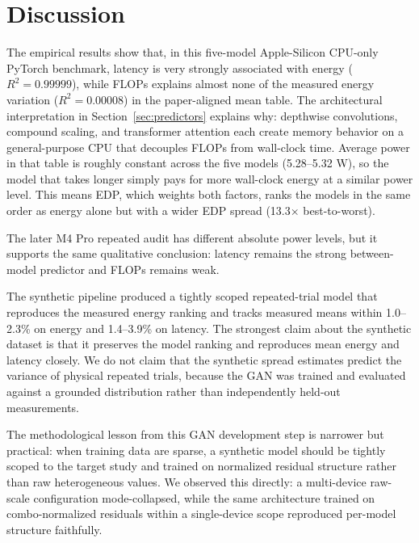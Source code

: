 \documentclass[conference]{IEEEtran}
\begin{document}
\section{Discussion}
The empirical results show that, in this five-model Apple-Silicon CPU-only
PyTorch benchmark, latency is very strongly associated with energy
($R^2 = 0.99999$), while FLOPs explains almost none of the measured energy
variation ($R^2 = 0.00008$) in the paper-aligned mean table. The architectural
interpretation in Section~\ref{sec:predictors} explains why: depthwise
convolutions, compound scaling, and transformer attention each create memory
behavior on a general-purpose CPU that decouples FLOPs from wall-clock time.
Average power in that table is roughly constant across the five models
(5.28--5.32 W), so
the model that takes longer simply pays for more wall-clock energy at a
similar power level. This means EDP, which weights both factors, ranks the
models in the same order as energy alone but with a wider EDP spread
(13.3$\times$ best-to-worst).

The later M4 Pro repeated audit has different absolute power levels, but it
supports the same qualitative conclusion: latency remains the strong
between-model predictor and FLOPs remains weak.

The synthetic pipeline produced a tightly scoped repeated-trial model that
reproduces the measured energy ranking and tracks measured means within
1.0--2.3\% on energy and 1.4--3.9\% on latency. The strongest claim about
the synthetic dataset is that it preserves the model ranking and reproduces
mean energy and latency closely. We do not claim that the synthetic spread
estimates predict the variance of physical repeated trials, because the GAN
was trained and evaluated against a grounded distribution rather than
independently held-out measurements.

The methodological lesson from this GAN development step is narrower but
practical: when training data are sparse, a synthetic model should be tightly
scoped to the target study and trained on normalized residual structure rather
than raw heterogeneous values. We observed this directly: a multi-device
raw-scale configuration mode-collapsed, while the same architecture trained
on combo-normalized residuals within a single-device scope reproduced
per-model structure faithfully.
\end{document}
